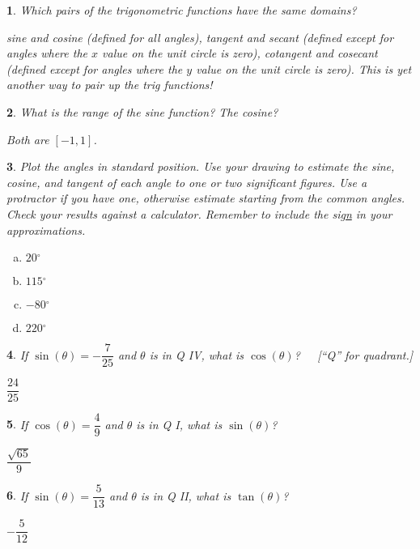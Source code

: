\documentclass{amsbook}
\newcommand{\ssp}{\begin{enumerate}[(a), leftmargin=*]}
\newcommand{\esp}{\end{enumerate}}
\newtheorem{exc}{}
\newenvironment{ex}{\begin{exc}\normalfont}{\end{exc}}
\numberwithin{section}{chapter}
\numberwithin{equation}{chapter}
\newcommand{\dg}{{^\circ}}
\begin{document}
\begin{ex}
Which pairs of the trigonometric functions have the same domains?
	\begin{sol}
		sine and cosine (defined for all angles), tangent and secant (defined except for angles where the $x$ value on the unit circle is zero), cotangent and cosecant (defined except for angles where the $y$ value on the unit circle is zero). This is yet another way to pair up the trig functions!
	\end{sol}
\end{ex}

\begin{ex}
	What is the range of the sine function? The cosine?
	\begin{sol}
		Both are $[-1,1]$.
		\end{sol}
\end{ex}

\begin{ex}
	Plot the angles in standard position. Use your drawing to estimate the sine, cosine, and tangent of each angle to one or two significant figures. Use a protractor if you have one, otherwise estimate starting from the common angles. Check your results against a calculator. Remember to include the si\underline{gn} in your approximations.
		\begin{multicols}{3}
		\ssp
		\item $20\dg$
		\item $115\dg$
		\item $-80\dg$
		\item $220\dg$
		\esp
	\end{multicols}
\end{ex}

\begin{ex}
	If $\sin(\theta) = -\dfrac{7}{25}$ and $\theta$ is in Q IV, what is $\cos(\theta)$?\ \ \  [``Q'' for quadrant.]
	\begin{sol}
		$\dfrac{24}{25}$
	\end{sol}
\end{ex}


\begin{ex}
	If $\cos(\theta) = \dfrac{4}{9}$ and $\theta$ is in Q I, what is $\sin(\theta)$?
	\begin{sol}
		$\dfrac{\sqrt{65}}{9}$
	\end{sol}
\end{ex}

\begin{ex}
	If $\sin(\theta) = \dfrac{5}{13}$ and $\theta$ is in Q II, what is $\tan(\theta)$?
	\begin{sol}
		$-\dfrac{5}{12}$
	\end{sol}
\end{ex}
\end{document}
